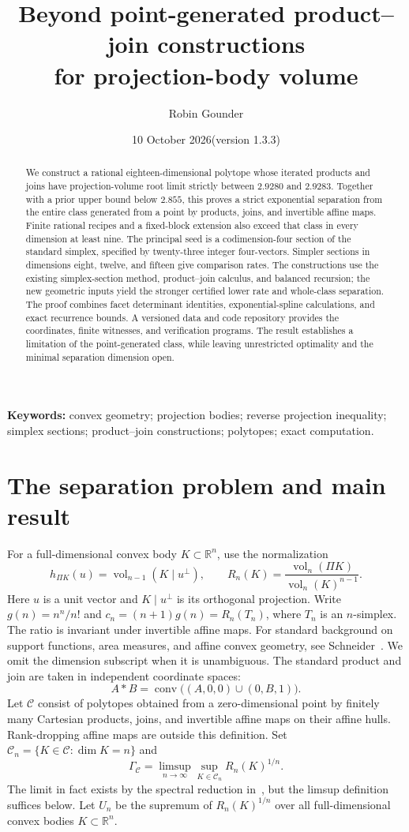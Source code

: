 \documentclass[11pt]{article}
\title{Beyond point-generated product--join constructions\protect\\for projection-body volume}
\author{Robin Gounder}
\date{10 October 2026\quad\textnormal{(version 1.3.3)}}
\DeclareMathOperator{\vol}{vol}
\DeclareMathOperator{\conv}{conv}
\newcommand{\R}{\mathbb R}
\newcommand{\CC}{\mathcal C}
\begin{document}
\maketitle
\begin{abstract}
We construct a rational eighteen-dimensional polytope whose iterated
products and joins have projection-volume root limit strictly between
$2.9280$ and $2.9283$. Together with a prior upper bound below $2.855$,
this proves a strict exponential separation from the entire class
generated from a point by products, joins, and invertible affine maps.
Finite rational recipes and a fixed-block extension also exceed that
class in every dimension at least nine. The principal seed is a
codimension-four section of the standard simplex, specified by twenty-three
integer four-vectors. Simpler sections in dimensions eight, twelve, and
fifteen give comparison rates. The constructions use the existing
simplex-section method, product--join calculus, and balanced recursion;
the new geometric inputs yield the stronger certified lower rate and
whole-class separation. The proof combines facet determinant identities,
exponential-spline calculations, and exact recurrence bounds. A versioned
data and code repository provides the coordinates, finite witnesses, and
verification programs. The result establishes a limitation of the
point-generated class, while leaving unrestricted optimality and the
minimal separation dimension open.
\end{abstract}
\noindent\textbf{Keywords:} convex geometry; projection bodies; reverse projection inequality;
simplex sections; product--join constructions; polytopes; exact computation.

\section{The separation problem and main result}
For a full-dimensional convex body $K\subset\R^n$, use the normalization
\[
 h_{\Pi K}(u)=\vol_{n-1}(K\mid u^\perp),\qquad
 R_n(K)=\frac{\vol_n(\Pi K)}{\vol_n(K)^{n-1}}.
\]
Here $u$ is a unit vector and $K\mid u^\perp$ is its orthogonal projection.
Write $g(n)=n^n/n!$ and $c_n=(n+1)g(n)=R_n(T_n)$, where $T_n$ is an
$n$-simplex. The ratio is invariant under invertible affine maps.
For standard background on support functions, area measures, and affine
convex geometry, see Schneider~\cite{schneider}.
We omit the dimension subscript when it is unambiguous.
The standard product and join are taken in independent coordinate spaces:
\[
 A*B=\conv\bigl((A,0,0)\cup(0,B,1)\bigr).
\]
Let $\CC$ consist of polytopes obtained from a zero-dimensional point by
finitely many Cartesian products, joins, and invertible affine maps on
their affine hulls. Rank-dropping affine maps are outside this definition.
Set $\CC_n=\{K\in\CC:\dim K=n\}$ and
\[
 \Gamma_{\CC}=\limsup_{n\to\infty}\sup_{K\in\CC_n}R_n(K)^{1/n}.
\]
The limit in fact exists by the spectral reduction in~\cite{mxym-spectral},
but the limsup definition suffices below.
Let $U_n$ be the supremum of $R_n(K)^{1/n}$ over all full-dimensional
convex bodies $K\subset\R^n$.
\end{document}
